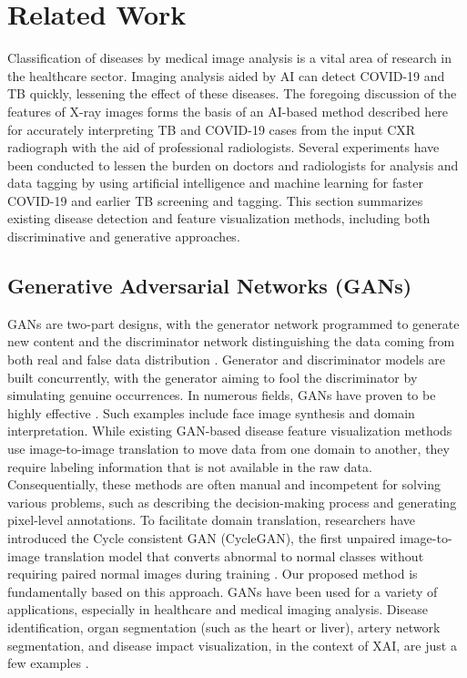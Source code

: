 \section{Related Work}
{Classification of diseases by medical image analysis is a vital area of research in the healthcare sector. Imaging analysis aided by AI can detect COVID-19 and TB quickly, lessening the effect of these diseases. The foregoing discussion of the features of X-ray images forms the basis of an AI-based method described here for accurately interpreting TB and COVID-19 cases from the input CXR radiograph with the aid of professional radiologists. Several experiments have been conducted to lessen the burden on doctors and radiologists for analysis and data tagging by using artificial intelligence and machine learning for faster COVID-19 and earlier TB screening and tagging. This section summarizes existing disease detection and feature visualization methods, including both discriminative and generative approaches.}

\subsection{Generative Adversarial Networks (GANs)}
{
GANs are two-part designs, with the generator network programmed to generate new content and the discriminator network distinguishing the data coming from both real and false data distribution \cite{19}. Generator and discriminator models are built concurrently, with the generator aiming to fool the discriminator by simulating genuine occurrences. In numerous fields, GANs have proven to be highly effective \cite{20,21}. Such examples include face image synthesis and domain interpretation. While existing GAN-based disease feature visualization methods use image-to-image translation to move data from one domain to another, they require labeling information that is not available in the raw data. Consequentially, these methods are often manual and incompetent for solving various problems, such as describing the decision-making process and generating pixel-level annotations. To facilitate domain translation, researchers have introduced the Cycle consistent GAN (CycleGAN), the first unpaired image-to-image translation model that converts abnormal to normal classes without requiring paired normal images during training \cite{22}. Our proposed method is fundamentally based on this approach. GANs have been used for a variety of applications, especially in healthcare and medical imaging analysis. Disease identification, organ segmentation (such as the heart or liver), artery network segmentation, and disease impact visualization, in the context of XAI, are just a few examples \cite{23,24}.
}

